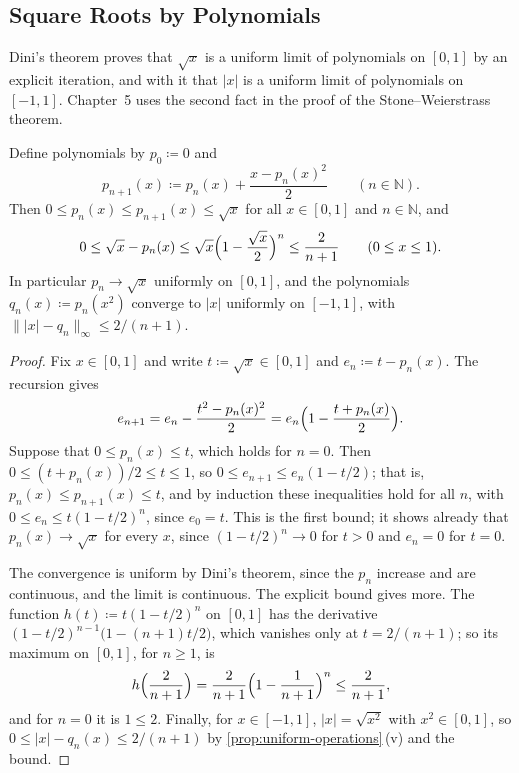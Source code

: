\subsection{Square Roots by Polynomials}

Dini's theorem proves that $\sqrt x$ is a uniform limit of polynomials on $[0,1]$ by an explicit iteration, and with it that $|x|$ is a uniform limit of polynomials on $[-1,1]$. Chapter~5 uses the second fact in the proof of the Stone--Weierstrass theorem.

\begin{proposition}
\label{prop:sqrt-polynomials}
Define polynomials by $p_0\coloneqq0$ and
\[
p_{n+1}(x)\coloneqq p_n(x)+\frac{x-p_n(x)^2}2\qquad(n\in\mathbb N).
\]
Then $0\le p_n(x)\le p_{n+1}(x)\le\sqrt x$ for all $x\in[0,1]$ and $n\in\mathbb N$, and
\[
0\le\sqrt x-p_n(x)\le\sqrt x\Bigl(1-\frac{\sqrt x}2\Bigr)^n\le\frac2{n+1}\qquad(0\le x\le1).
\]
In particular $p_n\to\sqrt x$ uniformly on $[0,1]$, and the polynomials $q_n(x)\coloneqq p_n(x^2)$ converge to $|x|$ uniformly on $[-1,1]$, with $\||x|-q_n\|_\infty\le2/(n+1)$.
\end{proposition}

\begin{proof}
Fix $x\in[0,1]$ and write $t\coloneqq\sqrt x\in[0,1]$ and $e_n\coloneqq t-p_n(x)$. The recursion gives
\[
e_{n+1}=e_n-\frac{t^2-p_n(x)^2}2=e_n\Bigl(1-\frac{t+p_n(x)}2\Bigr).
\]
Suppose that $0\le p_n(x)\le t$, which holds for $n=0$. Then $0\le(t+p_n(x))/2\le t\le1$, so $0\le e_{n+1}\le e_n(1-t/2)$; that is, $p_n(x)\le p_{n+1}(x)\le t$, and by induction these inequalities hold for all $n$, with $0\le e_n\le t(1-t/2)^n$, since $e_0=t$. This is the first bound; it shows already that $p_n(x)\to\sqrt x$ for every $x$, since $(1-t/2)^n\to0$ for $t>0$ and $e_n=0$ for $t=0$.

The convergence is uniform by Dini's theorem, since the $p_n$ increase and are continuous, and the limit is continuous. The explicit bound gives more. The function $h(t)\coloneqq t(1-t/2)^n$ on $[0,1]$ has the derivative $(1-t/2)^{n-1}\bigl(1-(n+1)t/2\bigr)$, which vanishes only at $t=2/(n+1)$; so its maximum on $[0,1]$, for $n\ge1$, is
\[
h\Bigl(\frac2{n+1}\Bigr)=\frac2{n+1}\Bigl(1-\frac1{n+1}\Bigr)^n\le\frac2{n+1},
\]
and for $n=0$ it is $1\le2$. Finally, for $x\in[-1,1]$, $|x|=\sqrt{x^2}$ with $x^2\in[0,1]$, so $0\le|x|-q_n(x)\le2/(n+1)$ by \cref{prop:uniform-operations}\,(v) and the bound.
\end{proof}

